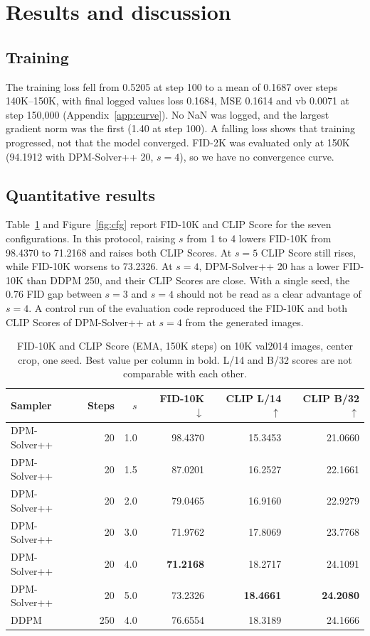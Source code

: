 \documentclass{article}
\begin{document}
\section{Results and discussion}

\subsection{Training}

The training loss fell from 0.5205 at step 100 to a mean of 0.1687 over steps 140K--150K, with final logged values loss 0.1684, MSE 0.1614 and vb 0.0071 at step 150,000 (Appendix~\ref{app:curve}).
No NaN was logged, and the largest gradient norm was the first (1.40 at step 100).
A falling loss shows that training progressed, not that the model converged.
FID-2K was evaluated only at 150K (94.1912 with DPM-Solver++ 20, $s=4$), so we have no convergence curve.

\subsection{Quantitative results}

Table~\ref{tab:main} and Figure~\ref{fig:cfg} report FID-10K and CLIP Score for the seven configurations.
In this protocol, raising $s$ from 1 to 4 lowers FID-10K from 98.4370 to 71.2168 and raises both CLIP Scores.
At $s=5$ CLIP Score still rises, while FID-10K worsens to 73.2326.
At $s=4$, DPM-Solver++ 20 has a lower FID-10K than DDPM 250, and their CLIP Scores are close.
With a single seed, the 0.76 FID gap between $s=3$ and $s=4$ should not be read as a clear advantage of $s=4$.
A control run of the evaluation code reproduced the FID-10K and both CLIP Scores of DPM-Solver++ at $s=4$ from the generated images.

\begin{table}[t]
  \caption{FID-10K and CLIP Score (EMA, 150K steps) on 10K val2014 images, center crop, one seed. Best value per column in bold. L/14 and B/32 scores are not comparable with each other.}
  \label{tab:main}
  \centering
  \small
  \begin{tabular}{@{}lrrrrr@{}}
    \toprule
    Sampler & Steps & $s$ & FID-10K $\downarrow$ & CLIP L/14 $\uparrow$ & CLIP B/32 $\uparrow$ \\
    \midrule
    DPM-Solver++ & 20 & 1.0 & 98.4370 & 15.3453 & 21.0660 \\
    DPM-Solver++ & 20 & 1.5 & 87.0201 & 16.2527 & 22.1661 \\
    DPM-Solver++ & 20 & 2.0 & 79.0465 & 16.9160 & 22.9279 \\
    DPM-Solver++ & 20 & 3.0 & 71.9762 & 17.8069 & 23.7768 \\
    DPM-Solver++ & 20 & 4.0 & \textbf{71.2168} & 18.2717 & 24.1091 \\
    DPM-Solver++ & 20 & 5.0 & 73.2326 & \textbf{18.4661} & \textbf{24.2080} \\
    DDPM & 250 & 4.0 & 76.6554 & 18.3189 & 24.1666 \\
    \bottomrule
  \end{tabular}
\end{table}
\end{document}
